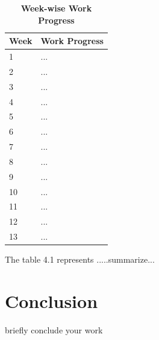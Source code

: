 \begin{table}[h]
    \centering
    \caption{\textbf{Week-wise Work Progress}}
    \begin{center}  
        \begin{tabular}{|p{1.5cm}|p{10.0cm}|}
            \hline
            \textbf{Week} & \textbf{Work Progress} \\ \hline
            1 &  ... \\ \hline
            2 & ... \\ \hline
            3 &  ... \\ \hline
            4 &  ... \\ \hline
            5 &  ... \\ \hline
            6 &  ... \\ \hline
            7 & ... \\ \hline
            8 &  ... \\ \hline
            9 &  ... \\ \hline
            10 &  ... \\ \hline
             11 &  ... \\ \hline
            12 & ... \\ \hline
            13 &  ... \\ \hline
       
        \end{tabular}
    \end{center}
    \label{tab:work}
\end{table}
The table 4.1 represents .....summarize...
\newpage
\section{Conclusion}
briefly conclude your work 



